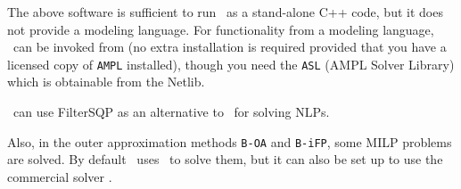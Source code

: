 The above software is sufficient to run \Bonmin\ as a
stand-alone C++ code, but it does not provide a modeling language.
For functionality from a modeling language, \Bonmin\ can be
invoked from  (no extra installation is required provided
that you have a licensed copy of {\tt AMPL} installed), though you
need the {\tt ASL} (AMPL Solver Library) which is obtainable from the Netlib.

\Bonmin\ can use FilterSQP  as an alternative to \Ipopt\ for solving NLPs.

Also, in the outer approximation methods {\tt B-OA} and {\tt B-iFP}, some MILP problems are
solved. By default \Bonmin\ uses  \Cbc\ to solve them, but it can also be set up to use
the commercial solver .


